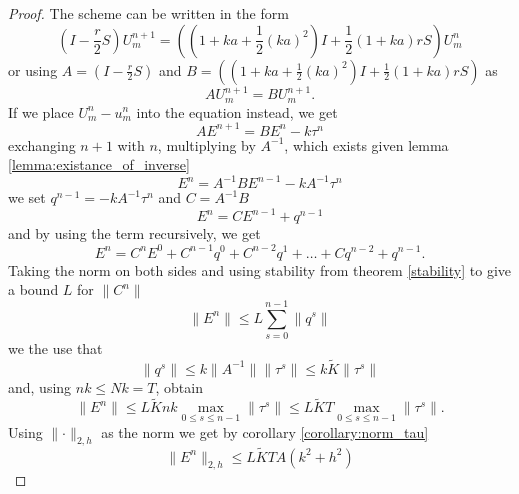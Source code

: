 \begin{proof}
    The scheme can be written in the form
    $$\left(I - \frac{r}{2}S \right)U_{m}^{n+1} = \left( \left(1+ka+\frac{1}{2}(ka)^2\right)I + \frac{1}{2}\left(1+ka\right)rS\right)U_{m}^n$$
    or using $A = \left(I - \frac{r}{2}S \right)$ and $B = \left( \left(1+ka+\frac{1}{2}(ka)^2\right)I + \frac{1}{2}\left(1+ka\right)rS\right)$ as
    $$AU_{m}^{n+1} = BU_{m}^{n+1}.$$
    If we place $U_m^n - u_m^n$ into the equation instead, we get
    $$AE^{n+1} = BE^n - k\tau^n$$
    exchanging $n+1$ with $n$, multiplying by $A^{-1}$, which exists given lemma \ref{lemma:existance_of_inverse}
    $$E^n = A^{-1}BE^{n-1} -kA^{-1}\tau^n$$
    we set $q^{n-1}= -kA^{-1}\tau^n$ and $C=A^{-1}B$
    $$E^n = CE^{n-1}+q^{n-1}$$
    and by using the term recursively, we get
    $$E^n = C^nE^{0}+C^{n-1}q^0 + C^{n-2}q^1 + \dots + C q^{n-2} +  q^{n-1}.$$
    Taking the norm on both sides and using stability from theorem \ref{stability} to give a bound $L$ for $\lVert C^n \lVert$
    $$\lVert E^n\lVert  \leq L\sum_{s=0}^{n-1}\lVert q^s \lVert$$
    we the use that 
    $$\lVert q^s \lVert \leq k \lVert A^{-1} \lVert \lVert\tau^s \lVert \leq k \tilde{K} \lVert\tau^s \lVert$$
    and, using $nk\leq Nk=T$, obtain
    $$\lVert E^n \lVert \leq L \tilde{K}nk \max_{0\leq s \leq n-1} \lVert \tau^s\lVert \leq L \tilde{K}T\max_{0\leq s \leq n-1} \lVert \tau^s\lVert.$$
    Using $\lVert \cdot \lVert_{2, h}$ as the norm we get by corollary \ref{corollary:norm_tau}
    $$\lVert E^n \lVert_{2, h} \leq L \tilde{K}TA(k^2+h^2)$$
\end{proof}

